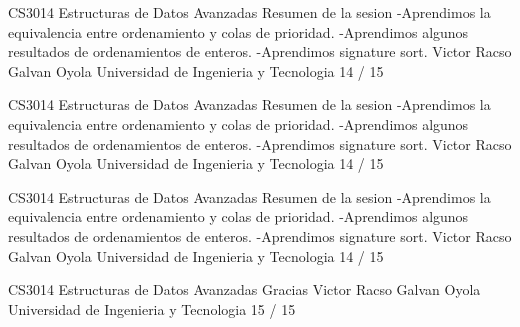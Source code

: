 \begin{description}[leftmargin=!,labelwidth=4.2em,style=nextline]
\item[Pag. 56] CS3014 Estructuras de Datos Avanzadas Resumen de la sesion -Aprendimos la equivalencia entre ordenamiento y colas de prioridad. -Aprendimos algunos resultados de ordenamientos de enteros. -Aprendimos signature sort. Victor Racso Galvan Oyola Universidad de Ingenieria y Tecnologia 14 / 15
\item[Pag. 57] CS3014 Estructuras de Datos Avanzadas Resumen de la sesion -Aprendimos la equivalencia entre ordenamiento y colas de prioridad. -Aprendimos algunos resultados de ordenamientos de enteros. -Aprendimos signature sort. Victor Racso Galvan Oyola Universidad de Ingenieria y Tecnologia 14 / 15
\item[Pag. 58] CS3014 Estructuras de Datos Avanzadas Resumen de la sesion -Aprendimos la equivalencia entre ordenamiento y colas de prioridad. -Aprendimos algunos resultados de ordenamientos de enteros. -Aprendimos signature sort. Victor Racso Galvan Oyola Universidad de Ingenieria y Tecnologia 14 / 15
\item[Pag. 59] CS3014 Estructuras de Datos Avanzadas Gracias Victor Racso Galvan Oyola Universidad de Ingenieria y Tecnologia 15 / 15
\end{description}
